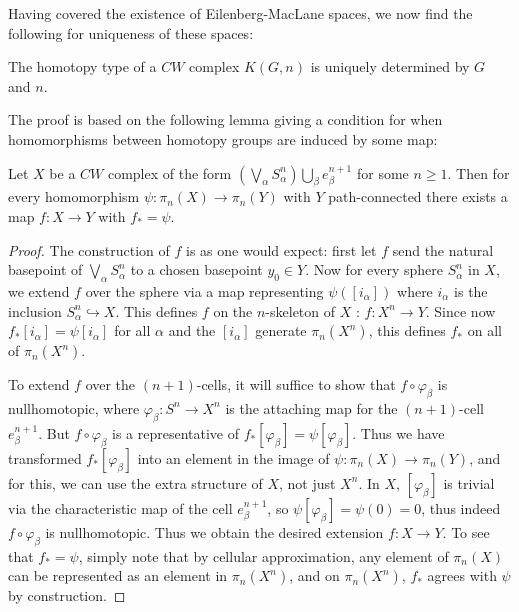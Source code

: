 Having covered the existence of Eilenberg-MacLane spaces, we
now find the following for uniqueness of these spaces:

\begin{proposition}\label{Prop:23SUIHD}
    The homotopy type of a $CW$ complex
    $K(G,n)$ is uniquely determined by $G$ and $n$.
\end{proposition}

The proof is based on the following
lemma giving a condition for when homomorphisms
between homotopy groups are induced by some
map:

\begin{lemma}[]\label{Lemma:NDWUAI288}
    Let $X$ be a $CW$ complex of the form
    $\left( \bigvee_{\alpha} S_{\alpha}^{n} \right) 
    \bigcup_{\beta} e_{\beta}^{n+1}$ for some $n\ge 1$.
    Then for every homomorphism $\psi \colon
    \pi_n (X) \to \pi_n (Y)$ with $Y$ path-connected
    there exists a map $f \colon X \to Y$ with
    $f_* = \psi $.
\end{lemma}

\begin{proof}
    The construction of $f$ is as one would expect:
    first let $f$ send the natural basepoint of
    $\bigvee_{\alpha} S_{\alpha}^{n}$ to a chosen
    basepoint $y_0 \in Y$.
    Now for every sphere $S_{\alpha}^{n}$ in $X$,
    we extend $f$ over the sphere via a map
    representing $\psi \left( \left[ i_{\alpha} \right]  \right) 
    $ where $i_{\alpha}$ is the inclusion
    $S_{\alpha}^{n} \hookrightarrow X$. This defines
    $f$ on the $n$-skeleton of $X$ : $f \colon X^{n} \to Y$.
    Since now $f_* \left[ i_{\alpha} \right] =
    \psi \left[ i_{\alpha} \right] $ for all $\alpha$ and
    the $\left[ i_{\alpha} \right] $ generate
    $\pi_n \left( X^{n} \right) $, this
    defines $f_*$ on all of $\pi_n(X^{n})$.

    To extend $f$ over the $(n+1)$-cells, it will suffice
    to show that $f \circ \varphi_{\beta}$ is nullhomotopic,
    where $\varphi_{\beta} \colon S^{n} \to X^{n}$ is the
    attaching map for the $(n+1)$-cell $e_{\beta}^{n+1}$.
    But $f \circ \varphi_{\beta}$ is a representative
    of $f_* \left[ \varphi_{\beta} \right] =
    \psi \left[ \varphi_{\beta} \right] $.
    Thus we have transformed $f_* \left[ \varphi_{\beta} \right] $ 
    into an element in the image of
    $\psi \colon \pi_n(X) \to \pi_n(Y)$, and
    for this, we can use the extra structure of $X$, not just
    $X^{n}$. In $X$, $\left[ \varphi_{\beta} \right] $ is
    trivial via the
    characteristic map of the cell
    $e_{\beta}^{n+1}$, so $\psi \left[ \varphi_{\beta} \right] =
    \psi (0) = 0$, thus indeed
    $f \circ \varphi_{\beta}$ is nullhomotopic.
    Thus we obtain the desired extension
    $f \colon X \to Y$.
    To see that $f_* = \psi $, simply note that
    by cellular approximation, any element
    of $\pi_n(X)$ can be represented as
    an element in $\pi_n(X^{n})$, and on
    $\pi_n(X^{n})$, $f_*$ agrees with $\psi $ by construction.
\end{proof}


